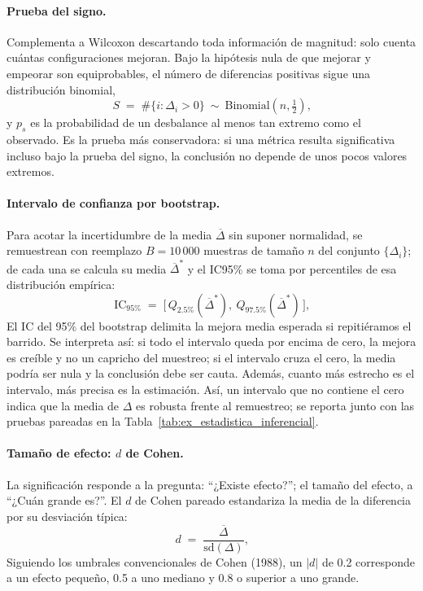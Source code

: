 \documentclass[12pt,a4paper]{report}
\begin{document}
\paragraph{Prueba del signo.} Complementa a Wilcoxon descartando toda información de magnitud: solo cuenta cuántas configuraciones mejoran. Bajo la hipótesis nula de que mejorar y empeorar son equiprobables, el número de diferencias positivas sigue una distribución binomial,
\begin{equation}
S \;=\; \#\{i:\Delta_i>0\}\ \sim\ \mathrm{Binomial}\!\left(n,\tfrac12\right)\text{,}
\label{eq:signo}
\end{equation}
y $p_s$ es la probabilidad de un desbalance al menos tan extremo como el observado. Es la prueba más conservadora: si una métrica resulta significativa incluso bajo la prueba del signo, la conclusión no depende de unos pocos valores extremos.

\paragraph{Intervalo de confianza por bootstrap.} Para acotar la incertidumbre de la media $\overline{\Delta}$ sin suponer normalidad, se remuestrean con reemplazo $B=10\,000$ muestras de tamaño $n$ del conjunto $\{\Delta_i\}$; de cada una se calcula su media $\overline{\Delta}^{*}$ y el IC95\% se toma por percentiles de esa distribución empírica:
\begin{equation}
\mathrm{IC}_{95\%} \;=\; \bigl[\,Q_{2.5\%}(\overline{\Delta}^{*}),\ Q_{97.5\%}(\overline{\Delta}^{*})\,\bigr]\text{,}
\label{eq:bootstrap}
\end{equation}
El IC del 95\% del bootstrap delimita la mejora media esperada si repitiéramos el barrido. Se interpreta así: si todo el intervalo queda por encima de cero, la mejora es creíble y no un capricho del muestreo; si el intervalo cruza el cero, la media podría ser nula y la conclusión debe ser cauta. Además, cuanto más estrecho es el intervalo, más precisa es la estimación. Así, un intervalo que no contiene el cero indica que la media de $\Delta$ es robusta frente al remuestreo; se reporta junto con las pruebas pareadas en la Tabla~\ref{tab:ex_estadistica_inferencial}.

\paragraph{Tamaño de efecto: $d$ de Cohen.} La significación responde a la pregunta: ``¿Existe efecto?''; el tamaño del efecto, a ``¿Cuán grande es?''. El $d$ de Cohen pareado estandariza la media de la diferencia por su desviación típica:
\begin{equation}
  d \;=\; \frac{\overline{\Delta}}{\mathrm{sd}(\Delta)}\text{,}
  \label{eq:cohen-d}
\end{equation}
Siguiendo los umbrales convencionales de Cohen (1988), un $|d|$ de 0.2 corresponde a un efecto pequeño, 0.5 a uno mediano y 0.8 o superior a uno grande.
\end{document}
